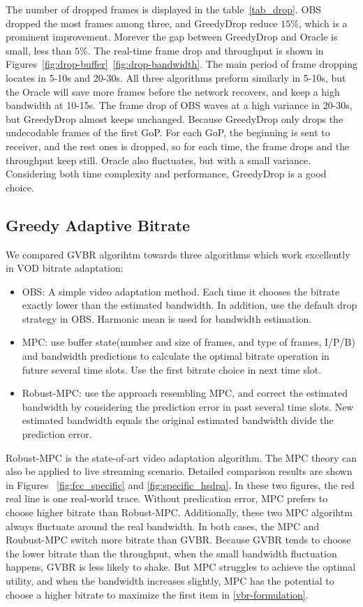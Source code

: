 

The number of dropped frames is displayed in the table~\ref{tab_drop}. OBS dropped the most frames among three, and GreedyDrop reduce $15\%$, which is a prominent improvement. Morever the gap between GreedyDrop and Oracle is small, less than $5\%$. The real-time frame drop and throughput is shown in Figures~\ref{fig:drop-buffer}~\ref{fig:drop-bandwidth}. The main period of frame dropping locates in 5-10s and 20-30s. All three algorithms preform similarly in 5-10s, but the Oracle will save more frames before the network recovers, and keep a high bandwidth at 10-15s. The frame drop of OBS waves at a high variance in 20-30s, but GreedyDrop almost keeps unchanged. Because GreedyDrop only drops the undecodable frames of the first GoP. For each GoP, the beginning is sent to receiver, and the rest ones is dropped, so for each time, the frame drops and the throughput keep still. Oracle also fluctuates, but with a small variance. Considering both time complexity and performance, GreedyDrop is a good choice.


\subsection{Greedy Adaptive Bitrate}

We compared GVBR algorihtm towards three algorithms which work excellently in VOD bitrate adaptation:
\begin{itemize}
  \item OBS: A simple video adaptation method. Each time it chooses the bitrate exactly lower than the estimated bandwidth. In addition, use the default drop strategy in OBS. Harmonic mean is used for bandwidth estimation.
  \item MPC: use buffer state(number and size of frames, and type of frames, I/P/B) and bandwidth predictions to calculate the optimal bitrate operation in future several time slots. Use the first bitrate choice in next time slot.
  \item Robust-MPC: use the approach resembling MPC, and correct the estimated bandwidth by considering the prediction error in past several time slots. New estimated bandwidth equals the original estimated bandwidth divide the prediction error.
\end{itemize}
Robust-MPC is the state-of-art video adaptation algorithm. The MPC theory can also be applied to live streaming scenario.
Detailed comparison results are shown in Figures ~\ref{fig:fcc_specific} and \ref{fig:specific_hsdpa}. In these two figures, the red real line is one real-world trace. Without predication error, MPC prefers to choose higher bitrate than Robust-MPC. Additionally, these two MPC algorihtm always fluctuate around the real bandwidth. In both cases, the MPC and Roubust-MPC switch more bitrate than GVBR. Because GVBR tends to choose the lower bitrate than the throughput, when the small bandwidth fluctuation happens, GVBR is less likely to shake. But MPC struggles to achieve the optimal utility, and when the bandwidth increases slightly, MPC has the potential to choose a higher bitrate to maximize the first item in \ref{vbr-formulation}.

